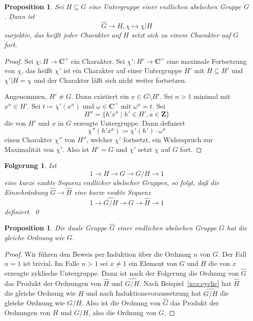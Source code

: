 \documentclass[a4paper,twoside,openright]{report}
\newtheorem{prop}[thm]{Proposition}
\newtheorem{cor}[thm]{Folgerung}
\theoremstyle{definition}
\theoremstyle{remark}
\begin{document}
\begin{prop}
  Sei $H \subseteq G$ eine Untergruppe einer endlichen abelschen Gruppe $G$. Dann
  ist
  \[
    \hat G \to \hat H, \chi \mapsto \chi|H
  \]
  surjektiv, das heißt jeder Charakter auf $H$ setzt sich zu einem Charakter auf
  $G$ fort.
\end{prop}

\begin{proof}
  Sei $\chi\colon H \to \mathbf C^\times$ ein Charakter. Sei $\chi'\colon H' \to \mathbf C^\times$
  eine maximale Fortsetzung von $\chi$, das heißt $\chi'$ ist ein Charakter
  auf einer Untergruppe $H'$ mit $H \subseteq H'$ und $\chi'|H = \chi$ und der
  Charakter läßt sich nicht weiter fortsetzen.
  
  Angenommen, $H' \neq G$. Dann existiert ein $x \in G \setminus H'$. Sei $n > 1$
  minimal mit $x^n \in H'$. Sei $t \coloneqq \chi'(x^n)$ und $\omega \in \mathbf C^\times$
  mit $\omega^n = t$. Sei
  \[
    H'' = \{h' x^a \mid h' \in H', a \in \mathbf Z\}
  \]
  die von $H'$ und $x$ in $G$ erzeugte Untergruppe. Dann definiert
  \[
    \chi''(h' x^a) \coloneqq \chi'(h') \cdot \omega^a
  \]
  einen Charakter $\chi''$ von $H''$, welcher $\chi'$ fortsetzt,
  ein Widerspruch zur Maximalität von $\chi'$. Also ist $H' = G$ und $\chi'$
  setzt $\chi$ auf $G$ fort. 
\end{proof}

\begin{cor}
  Ist 
  \[
    1 \to H \to G \to G/H \to 1
  \]
  eine kurze exakte Sequenz endlicher abelscher Gruppen, so folgt, daß die
  Einschränkung $\widehat G \to \widehat H$ eine kurze exakte Sequenz
  \[
    1 \to \widehat{G/H} \to \widehat G \to \widehat H \to 1
  \]
  definiert.
  \qed 
\end{cor}

\begin{prop}
  Die duale Gruppe $\widehat G$ einer endlichen abelschen Gruppe $G$ hat
  die gleiche Ordnung wie $G$.
\end{prop}

\begin{proof}
  Wir führen den Beweis per Induktion über die Ordnung $n$ von $G$. Der Fall
  $n = 1$ ist trivial. Im Falle $n > 1$ sei $x \neq 1$ ein Element von $G$
  und $H$ die von $x$ erzeugte zyklische Untergruppe. Dann ist nach der Folgerung
  die Ordnung von $\widehat G$ das Produkt der Ordnungen von $\widehat H$ und $\widehat{G/H}$.
  Nach Beispiel~\ref{xca:cyclic} hat $\widehat H$ die gleiche Ordnung wie $H$
  und nach Induktionsvoraussetzung hat $\widehat{G/H}$ die gleiche Ordnung wie
  $G/H$. Also ist die Ordnung von $\widehat G$ das Produkt der Ordnungen von
  $H$ und $G/H$, also die Ordnung von $G$.
\end{proof}
\end{document}
